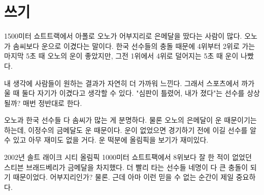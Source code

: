 \documentclass[11pt]{article}
\begin{document}
\section{쓰기}
\doublespacing
1500미터 쇼트트랙에서 아폴로 오노가 어부지리로 은메달을 땄다는 사람이 많다.  오노가 솜씨보다 운으로 이겼다는 말이다. 한국 선수들의 충돌 때문에 4위부터 2위로 가는 마지막 5초 때 오노의 운이 좋았지만, 그전 1위에서 4위로 덜어지는 5초 때 운이 나빴다. 

내 생각에 사람들이 원하는 결과가 자연히 더 가까워 느낀다. 그래서 스포츠에서 까가울 때 둘다 자기가 이겼다고 생각할 수 있다.  "심판이 틀렸어, 내가 졌다"는 선수를 상상될까? 매번 정반대로 한다.

오노과 한국 선수들 다 솜씨가 많는 게 분명하다. 물론 오노의 은메달이 운 때문이기는 하는데, 이정수의 금메달도 운 때문이다. 운이 없었으면 경기하기 전에 이길 선수를 알 수 있고 아무 재미도 없을 거다. 운 떡분에 올림픽을 보기가 재미있다.

2002년 솔트 래이크 시티 올림픽 1000미터 쇼트트팩에서 8위보다 잘 한 적이 없었던 스티븐 브래드베리가 금메달을 차지했다. 더 빨리 타는 선수들 네명이 다 큰 충돌이 되기 때문이었다. 어부지리인가? 물론. 근데 아마 이런 믿을 수 없는 순간이 제일 중요하다.
\end{document}
